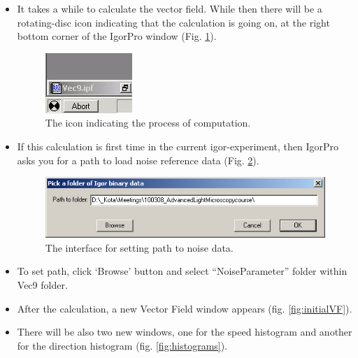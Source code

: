 \documentclass{article}
\begin{document}
\begin{itemize}
\itemsep1pt\parskip0pt
\item
  It takes a while to calculate the vector field. While then there will
  be a rotating-disc icon indicating that the calculation is going on,
  at the right bottom corner of the IgorPro window (Fig. \ref{fig:computationDisk}).

\begin{figure}[!ht]
\begin{center}
\includegraphics[scale=0.6]{img/calculationmeter.jpg}
\caption{ The icon indicating the process of computation.}
\label{fig:computationDisk}
\end{center}
\end{figure}

\item
  If this calculation is first time in the current igor-experiment, then
  IgorPro asks you for a path to load noise reference data (Fig. \ref{fig:noisedataPathsetter}).

\begin{figure}[!ht]
\begin{center}
\includegraphics[scale=0.6]{img/image030.png}
\caption{ The interface for setting path to noise data.}
\label{fig:noisedataPathsetter}
\end{center}
\end{figure}

\item
  To set path, click `Browse' button and select ``NoiseParameter''
  folder within Vec9 folder.
\item
  After the calculation, a new Vector Field window appears (fig. \ref{fig:initialVF}).
\item
  There will be also two new windows, one for the speed histogram and
  another for the direction histogram (fig. \ref{fig:histograms}).
\end{itemize}
\end{document}
